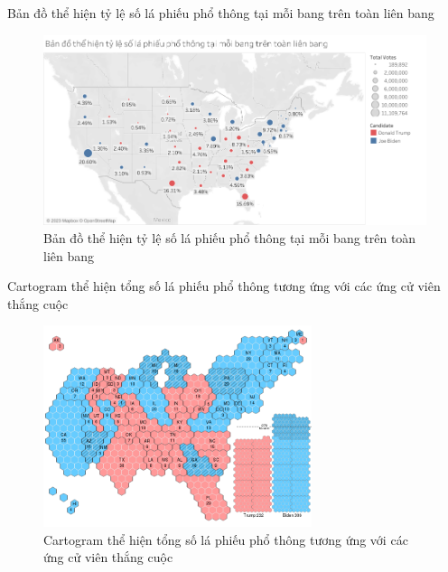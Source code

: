 \documentclass[10pt]{beamer}
\theoremstyle{remark}
\theoremstyle{definition}
\begin{document}
\begin{frame}{Bản đồ thể hiện tỷ lệ số lá phiếu phổ thông tại mỗi bang trên toàn liên bang}
	\begin{figure}[h!]
        \centering
        \includegraphics[width=\textwidth]{State_Percentage_Vote_Circle.png}
        \caption{Bản đồ thể hiện tỷ lệ số lá phiếu phổ thông tại mỗi bang trên toàn liên bang}
    \end{figure}
\end{frame}

\begin{frame}{Cartogram thể hiện tổng số lá phiếu phổ thông tương ứng với các ứng cử viên thắng cuộc}
	\begin{figure}[h!]
        \centering
        \includegraphics[width=0.7\textwidth]{State_Total_Vote_Cartogram.png}
        \caption{Cartogram thể hiện tổng số lá phiếu phổ thông tương ứng với các ứng cử viên thắng cuộc}
    \end{figure}
\end{frame}
\end{document}
